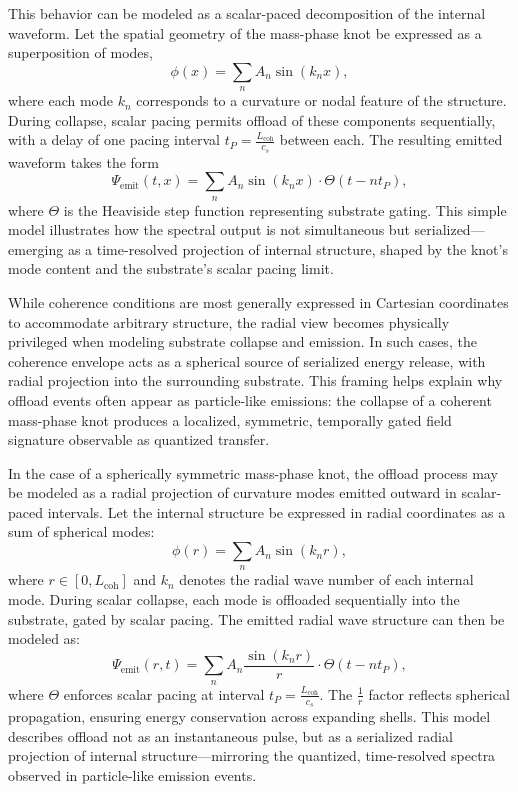 \documentclass[entropy,article,submit,pdftex,oneauthor]{Definitions/mdpi}
\begin{document}
This behavior can be modeled as a scalar-paced decomposition of the internal waveform. Let the spatial geometry of the mass-phase knot be expressed as a superposition of modes,
\[
\phi(x) = \sum_n A_n \sin(k_n x),
\]
where each mode \( k_n \) corresponds to a curvature or nodal feature of the structure. During collapse, scalar pacing permits offload of these components sequentially, with a delay of one pacing interval \( t_P = \frac{L_{\text{coh}}}{c_s} \) between each. The resulting emitted waveform takes the form
\[
\Psi_{\text{emit}}(t, x) = \sum_n A_n \sin(k_n x) \cdot \Theta(t - n t_P),
\]
where \( \Theta \) is the Heaviside step function representing substrate gating. This simple model illustrates how the spectral output is not simultaneous but serialized—emerging as a time-resolved projection of internal structure, shaped by the knot’s mode content and the substrate’s scalar pacing limit.

While coherence conditions are most generally expressed in Cartesian coordinates to accommodate arbitrary structure, the radial view becomes physically privileged when modeling substrate collapse and emission. In such cases, the coherence envelope acts as a spherical source of serialized energy release, with radial projection into the surrounding substrate. This framing helps explain why offload events often appear as particle-like emissions: the collapse of a coherent mass-phase knot produces a localized, symmetric, temporally gated field signature observable as quantized transfer.

In the case of a spherically symmetric mass-phase knot, the offload process may be modeled as a radial projection of curvature modes emitted outward in scalar-paced intervals. Let the internal structure be expressed in radial coordinates as a sum of spherical modes:
\[
\phi(r) = \sum_n A_n \sin(k_n r),
\]
where \( r \in [0, L_{\text{coh}}] \) and \( k_n \) denotes the radial wave number of each internal mode. During scalar collapse, each mode is offloaded sequentially into the substrate, gated by scalar pacing. The emitted radial wave structure can then be modeled as:
\[
\Psi_{\text{emit}}(r, t) = \sum_n A_n \frac{\sin(k_n r)}{r} \cdot \Theta(t - n t_P),
\]
where \( \Theta \) enforces scalar pacing at interval \( t_P = \frac{L_{\text{coh}}}{c_s} \). The \( \frac{1}{r} \) factor reflects spherical propagation, ensuring energy conservation across expanding shells. This model describes offload not as an instantaneous pulse, but as a serialized radial projection of internal structure—mirroring the quantized, time-resolved spectra observed in particle-like emission events.
\end{document}
